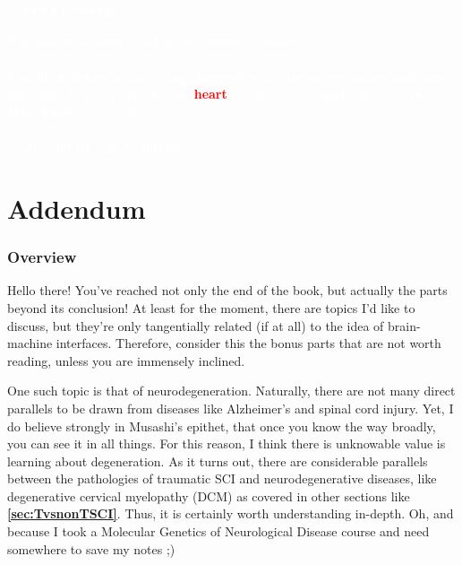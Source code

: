        \smallskip 

       \vspace{0.5in}

       {\selectfont \textbf{\Large \textcolor{white}{A FINAL NOTE: }}}

    \vspace{2cm}

        {\selectfont\textbf{\large \textcolor{white}{The world is always full of the sound of waves.\\ \\ The little fishes, abandoning themselves to the waves, dance and sing and play, but who knows the \textcolor{red}{heart} of the sea, a hundred feet down? Who knows its depth? \\ \\ -- Musashi by Eiji Yoshikawa}}}

    \vfill\pagebreak

\part{Addendum}

\label{sec:Addendum}

\section*{Overview}

Hello there! You've reached not only the end of the book, but actually the parts beyond its conclusion! At least for the moment, there are topics I'd like to discuss, but they're only tangentially related (if at all) to the idea of brain-machine interfaces. Therefore, consider this the bonus parts that are not worth reading, unless you are immensely inclined.\newline

One such topic is that of neurodegeneration. Naturally, there are not many direct parallels to be drawn from diseases like Alzheimer's and spinal cord injury. Yet, I do believe strongly in Musashi's epithet, that once you know the way broadly, you can see it in all things. For this reason, I think there is unknowable value is learning about degeneration. As it turns out, there are considerable parallels between the pathologies of traumatic SCI and neurodegenerative diseases, like degenerative cervical myelopathy (DCM) as covered in other sections like \textbf{\ref{sec:TvsnonTSCI}}. Thus, it is certainly worth understanding in-depth. Oh, and because I took a Molecular Genetics of Neurological Disease course and need somewhere to save my notes ;) 




